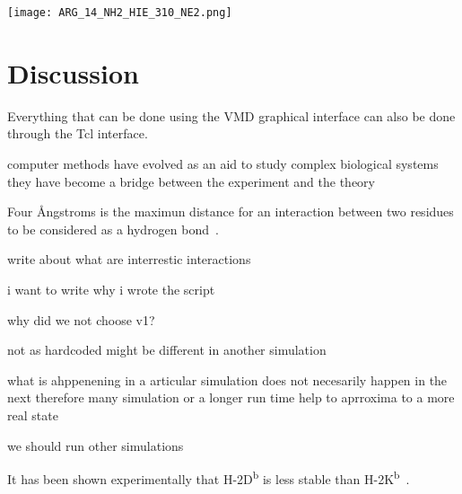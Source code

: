 \documentclass[11pt,twocolumn]{article}
\def\plus{\texttt{+}}
\newcommand{\db}{H-2D\textsuperscript{b}\xspace}
\newcommand{\kb}{H-2K\textsuperscript{b}\xspace}
\newcommand{\angstr}{{\AA}ngstroms\xspace}
\begin{document}
\begin{figure*}
\begin{center}
\texttt{[image: ARG\_14\_NH2\_HIE\_310\_NE2.png]}
\caption{\textbf{Example of a graph generated by \texttt{gnuplot} after processing the first line in the residue pair file (Listing \ref{resatexample}) with the two scripts (Listing \ref{Tcl.script} and \ref{generategnuplot.sh}).} The distance between the two interacting atoms for each of the two residue pairs represented in every frame of the simulation as $\plus$ or a $\times$. One pair was analysed in the conditions with peptide and initial velocity of v0. The other pair was analysed in the conditions without peptide and initial velocity of v0. The percentage calculated in Listing \ref{generategnuplot.sh} is displayed in the top right corner and the name of the analysed pair can be seen on the top of the graph. The blue line indicates the 4 \angstr cutoff value.}
\label{graphdemonstration}
\end{center}
\end{figure*}




\section*{Discussion}
Everything that can be done using the VMD graphical interface can also be done through the Tcl interface.

computer methods have evolved as an aid to study complex biological systems they have become a bridge between the experiment and  the theory

Four \angstr is the maximun distance for an interaction between two residues to be considered as a hydrogen bond~\cite{McDonald1994777}.

write about what are interrestic interactions 

i want to write why i wrote the script 

why did we not choose v1?

not as hardcoded might be different in another simulation 

what is ahppenening in a articular simulation does not necesarily happen in the next therefore many simulation or a longer run time help to aprroxima to a more real state

we should run other simulations 

It has been shown experimentally that \db is less stable than  \kb~\cite{Shields1999561}.

\pagebreak



\end{document}
